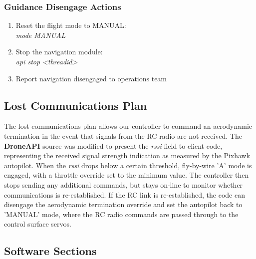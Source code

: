 \documentclass{aiaa}
\begin{document}
\subsubsection{Guidance Disengage Actions}
\begin{enumerate}
	\item Reset the flight mode to MANUAL: \\
	\textit{mode MANUAL}
	\item Stop the navigation module: \\
	\textit{api stop \textless threadid\textgreater}
	\item Report navigation disengaged to operations team
\end{enumerate}

\subsection{Lost Communications Plan}
The lost communications plan allows our controller to command an aerodynamic termination in the event that signals from the RC radio are not received. The \textbf{DroneAPI} source was modified to present the \textit{rssi} field to client code, representing the received signal strength indication as measured by the Pixhawk autopilot. When the \textit{rssi} drops below a certain threshold, fly-by-wire 'A' mode is engaged, with a throttle override set to the minimum value. The controller then stops sending any additional commands, but stays on-line to monitor whether communications is re-established. If the RC link is re-established, the code can disengage the aerodynamic termination override and set the autopilot back to 'MANUAL' mode, where the RC radio commands are passed through to the control surface servos.
\subsection{Software Sections}
\end{document}
